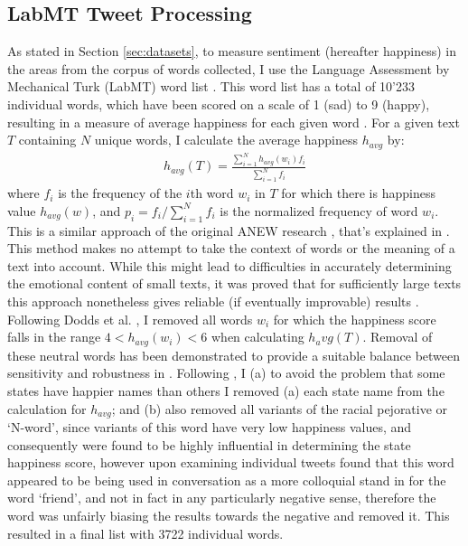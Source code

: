 \documentclass{llncs}
\begin{document}
\subsection{LabMT Tweet Processing}
\label{sec:meth1}
As stated in Section \ref{sec:datasets}, to measure sentiment (hereafter happiness) in the areas from the corpus of words collected, I use the Language Assessment by Mechanical Turk (LabMT) word list \cite{Dodds2011}. This word list has a total of 10'233 individual words, which have been scored on a scale of 1 (sad) to 9 (happy), resulting in a measure of average happiness for each given word \cite{Kloumann2012}. For a given text $T$ containing $N$ unique words, I calculate the average happiness $h_{avg}$ by:
\begin{align*}
h_{avg}(T) = \frac{\sum_{i=1}^{N} h_{avg}(w_i)f_i}{\sum_{i=1}^{N} f_i} \tag{1}\label{eq:1}
\end{align*}
where $f_i$ is the frequency of the $i$th word $w_i$ in $T$ for which there is happiness value $h_{avg}(w)$, and $p_i = f_i/\sum_{i=1}^{N}f_i$ is the normalized frequency of word $w_i$. This is a similar approach of the original ANEW research \cite{Bradley1999}, that's explained in \cite{Dodds2009}.
This method makes no attempt to take the context of words or the meaning of a text into account. While this might lead to difficulties in accurately determining the emotional content of small texts, it was proved that for sufficiently large texts this approach nonetheless gives reliable (if eventually improvable) results \cite{Dodds2011,Mitchell2013,Dodds2009,Kloumann2012}.
Following Dodds et al. \cite{Dodds2011}, I removed all words $w_i$ for which the happiness score falls in the range $4 < h_{avg}(w_i) < 6$ when calculating $h_avg(T)$. Removal of these neutral words has been demonstrated to provide a suitable balance between sensitivity and robustness in \cite{Dodds2011}. Following \cite{Mitchell2013}, I (a) to avoid the problem that some states have happier names than others I removed (a) each state name from the calculation for $h_{avg}$; and (b) also removed all variants of the racial pejorative or `N-word', since variants of this word have very low happiness values, and consequently were found to be highly influential in determining the state happiness score, however upon examining individual tweets \cite{Mitchell2013} found that this word appeared to be being used in conversation as a more colloquial stand in for the word `friend', and not in fact in any particularly negative sense, therefore the word was unfairly biasing \cite{Mitchell2013} the results towards the negative and removed it. This resulted in a final list with 3722 individual words.
\end{document}
